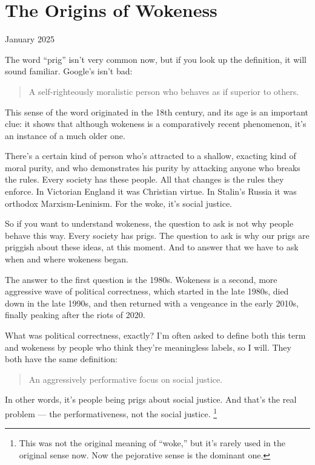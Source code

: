 \chapter{The Origins of Wokeness}

January 2025

The word ``prig'' isn't very common now, but if you look up the
definition, it will sound familiar. Google's isn't bad:

\begin{quote}
A self-righteously moralistic person who behaves as if superior to
others.
\end{quote}

This sense of the word originated in the 18th century, and its age is an
important clue: it shows that although wokeness is a comparatively
recent phenomenon, it's an instance of a much older one.

There's a certain kind of person who's attracted to a shallow, exacting
kind of moral purity, and who demonstrates his purity by attacking
anyone who breaks the rules. Every society has these people. All that
changes is the rules they enforce. In Victorian England it was Christian
virtue. In Stalin's Russia it was orthodox Marxism-Leninism. For the
woke, it's social justice.

So if you want to understand wokeness, the question to ask is not why
people behave this way. Every society has prigs. The question to ask is
why our prigs are priggish about these ideas, at this moment. And to
answer that we have to ask when and where wokeness began.

The answer to the first question is the 1980s. Wokeness is a second,
more aggressive wave of political correctness, which started in the late
1980s, died down in the late 1990s, and then returned with a vengeance
in the early 2010s, finally peaking after the riots of 2020.

What was political correctness, exactly? I'm often asked to define both
this term and wokeness by people who think they're meaningless labels,
so I will. They both have the same definition:

\begin{quote}
An aggressively performative focus on social justice.
\end{quote}

In other words, it's people being prigs about social justice. And that's
the real problem --- the performativeness, not the social justice.
\footnote{This was not the original meaning of ``woke,'' but it's rarely
used in the original sense now. Now the pejorative sense is the dominant
one.}

